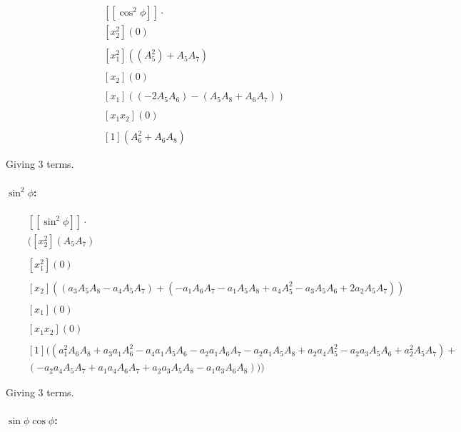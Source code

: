 \documentclass{article}
\begin{document}
\begin{align*}
    &[[\cos^2 \phi]] \cdot  \\
       &[ x_2^2] (0) \\
    \quad \\
    &[x_1^2] ((A_5^2) + A_5 A_7) \\
    \quad \\
    &[x_2] (0) \\
    \quad \\
    &[x_1] ((-2 A_5 A_6) - (A_5 A_8 + A_6 A_7) ) \\
    \quad \\
    &[x_1 x_2] (0) \\
    \quad \\
   &[1] ( A_6^2 + A_6 A_8 )
\end{align*}

Giving 3 terms.


\paragraph*{$\sin^2 \phi$:}

\begin{align*}
    &[[\sin^2 \phi]] \cdot \\
    &([x_2^2] (A_5 A_7) \\
    \quad \\
    &[x_1^2] (0) \\
    \quad \\
    &[x_2] ( (a_3 A_5 A_8-a_4 A_5 A_7) + (-a_1 A_6 A_7 - a_1 A_5 A_8 + a_4 A_5^2 - a_3 A_5 A_6 + 2 a_2 A_5 A_7)) \\
    \quad \\
    &[x_1] (0) \\
    \quad \\
    &[x_1 x_2] (0) \\
    \quad \\
    &[1] ((a_1^2 A_6 A_8 + a_3 a_1 A_6^2 - a_4 a_1 A_5 A_6 - a_2 a_1 A_6 A_7 - a_2 a_1 A_5 A_8 + a_2 a_4 A_5^2 - a_2 a_3 A_5 A_6 + a_2^2 A_5 A_7) + \\
    &( - a_2 a_4 A_5 A_7 + a_1 a_4 A_6 A_7 + a_2 a_3 A_5 A_8 - a_1 a_3 A_6 A_8) ) )
\end{align*}

Giving 3 terms.


\paragraph*{$\sin \phi \cos \phi$:}
\end{document}
